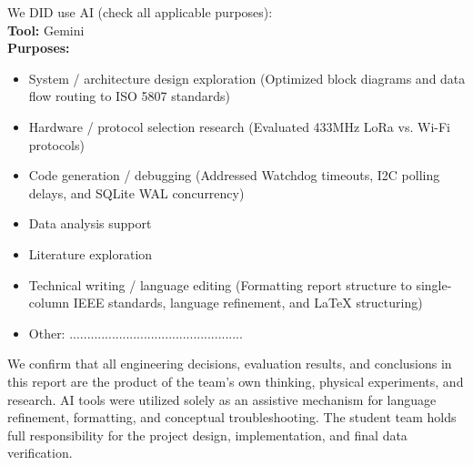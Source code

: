 \documentclass[11pt, a4paper]{article}
\begin{document}
\noindent [X] We DID use AI (check all applicable purposes): \\
\textbf{Tool:} Gemini \\
\textbf{Purposes:}
\begin{itemize}[label={--}, leftmargin=*]
    \item [X] System / architecture design exploration (Optimized block diagrams and data flow routing to ISO 5807 standards)
    \item [X] Hardware / protocol selection research (Evaluated 433MHz LoRa vs. Wi-Fi protocols)
    \item [X] Code generation / debugging (Addressed Watchdog timeouts, I2C polling delays, and SQLite WAL concurrency)
    \item [~~] Data analysis support
    \item [~~] Literature exploration
    \item [X] Technical writing / language editing (Formatting report structure to single-column IEEE standards, language refinement, and LaTeX structuring)
    \item [~~] Other: .................................................
\end{itemize}

\vspace{0.3cm}
\noindent We confirm that all engineering decisions, evaluation results, and conclusions in this report are the product of the team's own thinking, physical experiments, and research. AI tools were utilized solely as an assistive mechanism for language refinement, formatting, and conceptual troubleshooting. The student team holds full responsibility for the project design, implementation, and final data verification.
\end{document}
